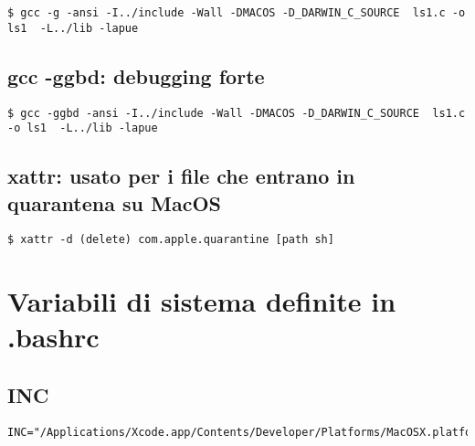 \begin{lstlisting}
$ gcc -g -ansi -I../include -Wall -DMACOS -D_DARWIN_C_SOURCE  ls1.c -o ls1  -L../lib -lapue
\end{lstlisting}


\subsection{gcc -ggbd: debugging forte}

\begin{lstlisting}
$ gcc -ggbd -ansi -I../include -Wall -DMACOS -D_DARWIN_C_SOURCE  ls1.c -o ls1  -L../lib -lapue
\end{lstlisting}


\subsection{xattr: usato per i file che entrano in quarantena su MacOS}

\begin{lstlisting}
$ xattr -d (delete) com.apple.quarantine [path sh]
\end{lstlisting}





\section{Variabili di sistema definite in .bashrc}

\subsection{INC}

\begin{lstlisting}
INC="/Applications/Xcode.app/Contents/Developer/Platforms/MacOSX.platform/Developer/SDKs/MacOSX.sdk/usr/include/"
\end{lstlisting}

